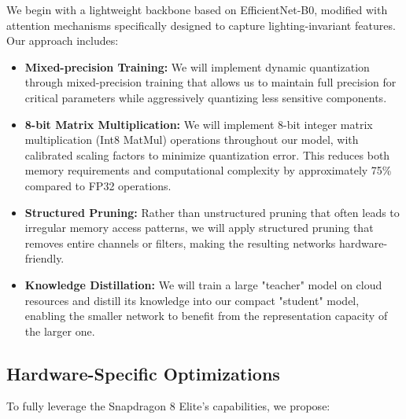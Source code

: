\documentclass[11pt, oneside]{article}   	%
\begin{document}
We begin with a lightweight backbone based on EfficientNet-B0, modified with attention mechanisms specifically designed to capture lighting-invariant features. Our approach includes:

\begin{itemize}
	\item \textbf{Mixed-precision Training:} We will implement dynamic quantization through mixed-precision training that allows us to maintain full precision for critical parameters while aggressively quantizing less sensitive components.

	\item \textbf{8-bit Matrix Multiplication:} We will implement 8-bit integer matrix multiplication (Int8 MatMul) operations throughout our model, with calibrated scaling factors to minimize quantization error. This reduces both memory requirements and computational complexity by approximately 75\% compared to FP32 operations.

	\item \textbf{Structured Pruning:} Rather than unstructured pruning that often leads to irregular memory access patterns, we will apply structured pruning that removes entire channels or filters, making the resulting networks hardware-friendly.

	\item \textbf{Knowledge Distillation:} We will train a large "teacher" model on cloud resources and distill its knowledge into our compact "student" model, enabling the smaller network to benefit from the representation capacity of the larger one.
\end{itemize}

\subsection*{Hardware-Specific Optimizations}

To fully leverage the Snapdragon 8 Elite's capabilities, we propose:
\end{document}

